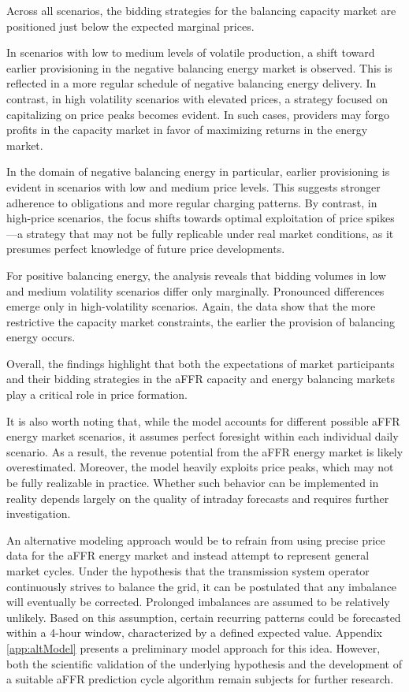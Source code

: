 Across all scenarios, the bidding strategies for the balancing capacity market are positioned just below the expected marginal prices.

In scenarios with low to medium levels of volatile production, a shift toward earlier provisioning in the negative balancing energy
market is observed. This is reflected in a more regular schedule of negative balancing energy delivery. In contrast, in high volatility
scenarios with elevated prices, a strategy focused on capitalizing on price peaks becomes evident. In such cases, providers may forgo
profits in the capacity market in favor of maximizing returns in the energy market.

In the domain of negative balancing energy in particular, earlier provisioning is evident in scenarios with low and medium price levels.
This suggests stronger adherence to obligations and more regular charging patterns. By contrast, in high-price scenarios, the focus shifts towards optimal exploitation of price spikes—a strategy that may not be fully replicable under real market conditions, as it presumes perfect knowledge of future price developments.

For positive balancing energy, the analysis reveals that bidding volumes in low and medium volatility scenarios differ only marginally.
Pronounced differences emerge only in high-volatility scenarios. Again, the data show that the more restrictive the capacity market
constraints, the earlier the provision of balancing energy occurs.

Overall, the findings highlight that both the expectations of market participants and their bidding strategies in the aFFR capacity and
energy balancing markets play a critical role in price formation.

It is also worth noting that, while the model accounts for different possible aFFR energy market scenarios,
it assumes perfect foresight within each individual daily scenario.
As a result, the revenue potential from the aFFR energy market is likely overestimated.
Moreover, the model heavily exploits price peaks, which may not be fully realizable in practice.
Whether such behavior can be implemented in reality depends largely on the quality of intraday forecasts
and requires further investigation.

An alternative modeling approach would be to refrain from using precise price data for the aFFR energy market
and instead attempt to represent general market cycles.
Under the hypothesis that the transmission system operator continuously strives to balance the grid,
it can be postulated that any imbalance will eventually be corrected.
Prolonged imbalances are assumed to be relatively unlikely.
Based on this assumption, certain recurring patterns could be forecasted within a 4-hour window,
characterized by a defined expected value.
Appendix \ref{app:altModel} presents a preliminary model approach for this idea.
However, both the scientific validation of the underlying hypothesis and the development of a suitable aFFR prediction cycle algorithm
remain subjects for further research.

